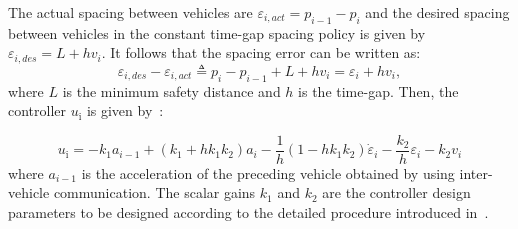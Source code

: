 {%
The actual spacing between vehicles are $\varepsilon_{i,act} = p_{i-1} - p_{i}$ 
and the desired spacing between 
vehicles in the constant time-gap spacing policy is given by $\varepsilon_{i,des} = {L} + h{v}_{i}$.
It follows that the spacing error can be written as: 
\begin{equation} \label{spacing_e}
    \varepsilon_{i,des} -\varepsilon_{i,act} \triangleq p_{i}-p_{i-1}+L+h{v}_{i} = \varepsilon_{i} + h{v}_{i},
\end{equation}
where ${L}$ is the minimum safety distance and $h$ is the time-gap.
Then, the controller $u_{\text{i}}$ is given by~\cite{rajamani2002semi}:

\begin{equation}\label{controller}
        u_{\text{i}} = -k_{1}{a}_{i-1}+(k_{1}+h k_{1}k_{2}){a}_{i}
        -\frac{1}{h}(1-h k_{1}k_{2})\dot{\varepsilon}_{i} -\frac{k_{2}}{h}\varepsilon_{i}-k_{2} {v}_{i}
\end{equation}
where ${a}_{i-1}$ is the acceleration of the preceding vehicle obtained by using inter-vehicle communication.
The scalar gains $k_1$ and $k_2$ are the controller design parameters to be designed according to the detailed procedure introduced in~\cite{rajamani2002semi}. 

}
